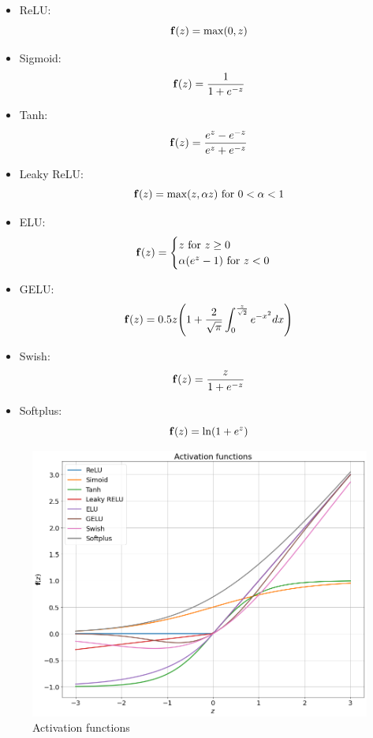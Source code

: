 \documentclass[14pt, a4paper]{article}
\numberwithin{equation}{section}
\numberwithin{algorithm}{section}
\numberwithin{figure}{section}
\begin{document}
\begin{itemize}
  \item ReLU:
  \begin{equation*}
    \bold{f}(z) = \max(0, z)
  \end{equation*}
  \item Sigmoid:
  \begin{equation*}
    \bold{f}(z) = \dfrac{1}{1 + e^{-z}}
  \end{equation*}
  \item Tanh:
  \begin{equation*}
    \bold{f}(z) = \dfrac{e^z - e^{-z}}{e^z + e^{-z}}
  \end{equation*}
  \item Leaky ReLU:
  \begin{equation*}
    \bold{f}(z)=\max(z, \alpha z) \text{ for } 0 < \alpha < 1
  \end{equation*}
  \item ELU:
  \begin{equation*}
    \bold{f}(z) = \begin{cases} z \text{ for } z \geq 0 \\ \alpha (e^z - 1) \text{ for } z < 0 \end{cases}
  \end{equation*}
  \item GELU:
  \begin{equation*}
    \bold{f}(z)=0.5 z \Bigg( 1 + \dfrac{2}{\sqrt{\pi}} \int_0^{\frac{z}{\sqrt{2}}} e^{-x^2}dx \Bigg)
  \end{equation*}
  \item Swish:
  \begin{equation*}
    \bold{f}(z) = \dfrac{z}{1 + e^{-z}}
  \end{equation*}
  \item Softplus:
  \begin{equation*}
    \bold{f}(z) = \ln(1 + e^z)
  \end{equation*}
\end{itemize}

\begin{figure}[h!]
  \centering
  \includegraphics[width=12cm]{activation_functions.png}
  \caption{Activation functions}
\end{figure}
\end{document}
